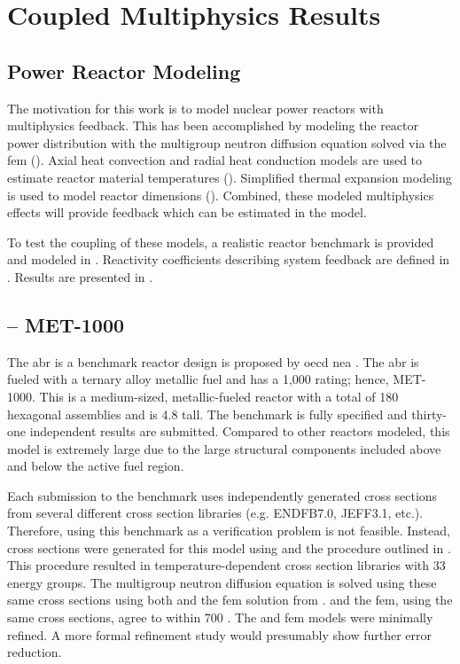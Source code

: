 \chapter{Coupled Multiphysics Results}
\label{ch:coupledResults}

\section{Power Reactor Modeling}
\label{sec:power_reactor_modeling}
  The motivation for this work is to model nuclear power reactors with
  multiphysics feedback. This has been accomplished by modeling the reactor
  power distribution with the multigroup neutron diffusion equation solved via
  the \gls{fem} (). Axial heat convection and radial
  heat conduction models are used to estimate reactor material temperatures
  ().  Simplified thermal expansion modeling is used
  to model reactor dimensions (). Combined, these
  modeled multiphysics effects will provide feedback which can be estimated in
  the model. 
  
  To test the coupling of these models, a realistic reactor benchmark is
  provided and modeled in . Reactivity coefficients describing 
  system feedback are defined in . Results are
  presented in .

\section{ -- MET-1000}
\label{sec:abr}
  The \gls{abr} is a benchmark reactor design is proposed by \gls{oecd}
  \gls{nea} \cite{abr}. The \gls{abr} is fueled with a ternary alloy metallic
  fuel and has a 1,000  rating; hence, MET-1000. This is a
  medium-sized, metallic-fueled reactor with a total of 180 hexagonal assemblies
  and is 4.8  tall.  The benchmark is fully specified and thirty-one
  independent results are submitted. Compared to other reactors modeled, this
  model is extremely large due to the large structural components included above
  and below the active fuel region.
  
  Each submission to the benchmark uses independently generated cross sections
  from several different cross section libraries (e.g. ENDFB7.0, JEFF3.1, etc.).
  Therefore, using this benchmark as a verification problem is not feasible.
  Instead, cross sections were generated for this model using \mcc and the
  procedure outlined in . This procedure
  resulted in temperature-dependent cross section libraries with 33 energy
  groups. The multigroup neutron diffusion equation is solved using these same
  cross sections using both \dif and the \gls{fem} solution from
  . \dif and the \gls{fem}, using the same cross
  sections, agree to within 700 . The
  \dif and \gls{fem} models were minimally refined. A more formal refinement
  study would presumably show further error reduction. 
  
